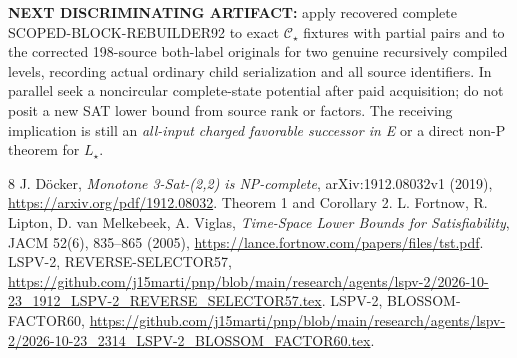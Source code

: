 \documentclass[10pt]{article}
\begin{document}
\textbf{NEXT DISCRIMINATING ARTIFACT:} apply recovered complete SCOPED-BLOCK-REBUILDER92 to exact \(\mathcal C_\star\) fixtures with partial pairs and to the corrected 198-source both-label originals for two genuine recursively compiled levels, recording actual ordinary child serialization and all source identifiers. In parallel seek a noncircular complete-state potential after paid acquisition; do not posit a new SAT lower bound from source rank or factors. The receiving implication is still an \emph{all-input charged favorable successor in E} or a direct non-P theorem for \(L_\star\).
\begin{thebibliography}{8}
 J. D\"ocker, \emph{Monotone 3-Sat-(2,2) is NP-complete}, arXiv:1912.08032v1 (2019), \url{https://arxiv.org/pdf/1912.08032}. Theorem 1 and Corollary 2.
 L. Fortnow, R. Lipton, D. van Melkebeek, A. Viglas, \emph{Time-Space Lower Bounds for Satisfiability}, JACM 52(6), 835--865 (2005), \url{https://lance.fortnow.com/papers/files/tst.pdf}.
 LSPV-2, REVERSE-SELECTOR57, \url{https://github.com/j15marti/pnp/blob/main/research/agents/lspv-2/2026-10-23_1912_LSPV-2_REVERSE_SELECTOR57.tex}.
 LSPV-2, BLOSSOM-FACTOR60, \url{https://github.com/j15marti/pnp/blob/main/research/agents/lspv-2/2026-10-23_2314_LSPV-2_BLOSSOM_FACTOR60.tex}.
\end{thebibliography}
\end{document}
